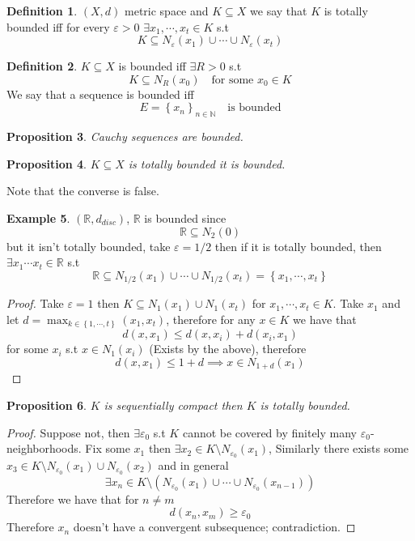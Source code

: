 \documentclass[11pt,a4paper]{article}
\theoremstyle{definition}
\newtheorem{definition}{Definition}[section]
\newtheorem{example}[definition]{Example}
\theoremstyle{plain}
\newtheorem{proposition}[definition]{Proposition}
\theoremstyle{remark}
\newcommand{\R}{\mathbb{R}}
\newcommand{\N}{\mathbb{N}}
\renewcommand{\set}[1]{\left\{ #1 \right\}}
\begin{document}
\begin{definition}
    $(X, d)$ metric space and $K \subseteq X$ we say that $K$ is totally bounded iff for every $\varepsilon > 0$ $\exists x_1, \cdots, x_t \in K$ s.t 
    $$K \subseteq N_{\varepsilon} (x_1) \cup \cdots \cup N_\varepsilon (x_t)$$ 
\end{definition}

\begin{definition}
    $K \subseteq X$ is bounded iff $\exists R > 0$ s.t 
    $$K \subseteq N_R (x_0) \quad \text{for some $x_0 \in K$}$$
    We say that a sequence is bounded iff 
    $$E = \set{x_n}_{n \in \N} \quad \text{is bounded}$$
\end{definition}

\begin{proposition}
    Cauchy sequences are bounded.
\end{proposition}

\begin{proposition}
    $K \subseteq X$ is totally bounded it is bounded. 
\end{proposition}

Note that the converse is false. 
\begin{example}
    $(\R, d_{disc})$, $\R$ is bounded since 
    $$\R \subseteq N_2(0)$$
    but it isn't totally bounded, take $\varepsilon = 1/2$ then if it is totally bounded, then $\exists x_1 \cdots x_t \in \R$ s.t 
    $$\R \subseteq N_{1/2} (x_1) \cup \cdots \cup N_{1/2} (x_t) = \set{x_1, \cdots, x_t}$$
\end{example}

\begin{proof}
    Take $\varepsilon = 1$ then $K \subseteq N_1(x_1) \cup N_1 (x_t)$ for $x_1, \cdots, x_t \in K$. 
    Take $x_1$ and let $d = \max_{k \in \set{1, \cdots, t}} (x_1, x_t)$, therefore for any $x \in K$ we have that 
    $$d(x, x_1) \leq d(x, x_i) + d(x_i, x_1)$$
    for some $x_i$ s.t $x \in N_1(x_i)$ (Exists by the above), therefore 
    $$d(x, x_1) \leq 1 + d \implies x \in N_{1 + d} (x_1)$$
\end{proof}

\begin{proposition}
    $K$ is sequentially compact then $K$ is totally bounded.
\end{proposition}

\begin{proof}
    Suppose not, then $\exists \varepsilon_0$ s.t $K$ cannot be covered by finitely many $\varepsilon_0$-neighborhoods. Fix some $x_1$ then 
    $\exists x_2 \in K \setminus N_{\varepsilon_0} (x_1)$, Similarly there exists some $x_3 \in K \setminus N_{\varepsilon_0} (x_1) \cup N_{\varepsilon_0} (x_2)$ 
    and in general 
    $$\exists x_n \in K \setminus ( N_{\varepsilon_0} (x_1) \cup \cdots \cup  N_{\varepsilon_0} (x_{n-1}))$$
    Therefore we have that for $n \neq m$
    $$d(x_n, x_m) \geq \varepsilon_0$$
    Therefore $x_n$ doesn't have a convergent subsequence; contradiction. 
\end{proof}
\end{document}
